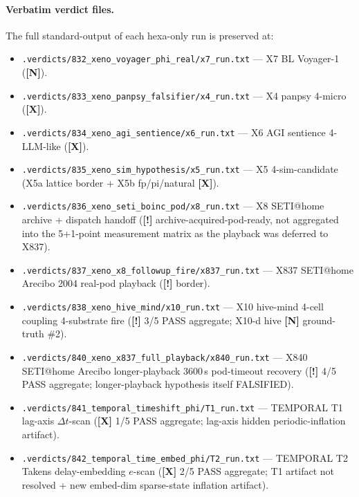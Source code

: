 \documentclass[11pt,a4paper]{article}
\providecommand{\tierGreen}{\textbf{[N]}}   %
\providecommand{\tierRed}{\textbf{[X]}}     %
\providecommand{\tierYellow}{\textbf{[!]}}  %
\begin{document}
\paragraph{Verbatim verdict files.} The full standard-output of each
hexa-only run is preserved at:
\begin{itemize}
  \item \texttt{.verdicts/832\_xeno\_voyager\_phi\_real/x7\_run.txt}
    --- X7 BL Voyager-1 (\tierGreen).
  \item \texttt{.verdicts/833\_xeno\_panpsy\_falsifier/x4\_run.txt}
    --- X4 panpsy 4-micro (\tierRed).
  \item \texttt{.verdicts/834\_xeno\_agi\_sentience/x6\_run.txt}
    --- X6 AGI sentience 4-LLM-like (\tierRed).
  \item \texttt{.verdicts/835\_xeno\_sim\_hypothesis/x5\_run.txt}
    --- X5 4-sim-candidate (X5a lattice border + X5b fp/pi/natural
    \tierRed).
  \item \texttt{.verdicts/836\_xeno\_seti\_boinc\_pod/x8\_run.txt}
    --- X8 SETI@home archive + dispatch handoff (\tierYellow
    archive-acquired-pod-ready, not aggregated into the 5+1-point
    measurement matrix as the playback was deferred to X837).
  \item \texttt{.verdicts/837\_xeno\_x8\_followup\_fire/x837\_run.txt}
    --- X837 SETI@home Arecibo 2004 real-pod playback (\tierYellow
    border).
  \item \texttt{.verdicts/838\_xeno\_hive\_mind/x10\_run.txt}
    --- X10 hive-mind 4-cell coupling 4-substrate fire (\tierYellow{}
    3/5 PASS aggregate; X10-d hive \tierGreen{} ground-truth \#2).
  \item \texttt{.verdicts/840\_xeno\_x837\_full\_playback/x840\_run.txt}
    --- X840 SETI@home Arecibo longer-playback 3600\,s pod-timeout
    recovery (\tierYellow{} 4/5 PASS aggregate; longer-playback
    hypothesis itself FALSIFIED).
  \item \texttt{.verdicts/841\_temporal\_timeshift\_phi/T1\_run.txt}
    --- TEMPORAL T1 lag-axis $\Delta t$-scan (\tierRed{} 1/5 PASS
    aggregate; lag-axis hidden periodic-inflation artifact).
  \item \texttt{.verdicts/842\_temporal\_time\_embed\_phi/T2\_run.txt}
    --- TEMPORAL T2 Takens delay-embedding $e$-scan (\tierRed{} 2/5 PASS
    aggregate; T1 artifact not resolved + new embed-dim
    sparse-state inflation artifact).
\end{itemize}
\end{document}
